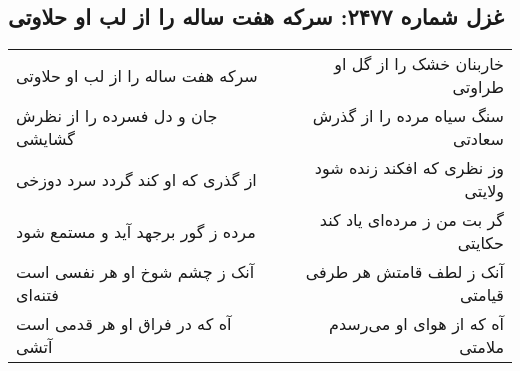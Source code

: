 \begin{center}
\section*{غزل شماره ۲۴۷۷: سرکه هفت ساله را از لب او حلاوتی}
\label{sec:2477}
\begin{longtable}{l p{0.5cm} r}
سرکه هفت ساله را از لب او حلاوتی
&&
خاربنان خشک را از گل او طراوتی
\\
جان و دل فسرده را از نظرش گشایشی
&&
سنگ سیاه مرده را از گذرش سعادتی
\\
از گذری که او کند گردد سرد دوزخی
&&
وز نظری که افکند زنده شود ولایتی
\\
مرده ز گور برجهد آید و مستمع شود
&&
گر بت من ز مرده‌ای یاد کند حکایتی
\\
آنک ز چشم شوخ او هر نفسی است فتنه‌ای
&&
آنک ز لطف قامتش هر طرفی قیامتی
\\
آه که در فراق او هر قدمی است آتشی
&&
آه که از هوای او می‌رسدم ملامتی
\\
\end{longtable}
\end{center}
